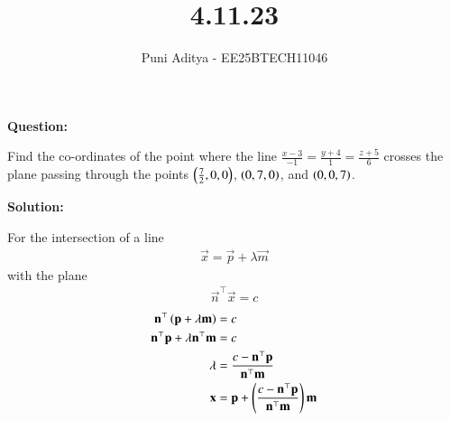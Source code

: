 \documentclass[journal]{IEEEtran}
\begin{document}
\title{4.11.23}
\author{Puni Aditya - EE25BTECH11046}
\maketitle

\textbf{Question:}

Find the co-ordinates of the point where the line $\frac{x-3}{-1} = \frac{y+4}{1} = \frac{z+5}{6}$ crosses the plane passing through the points $\left(\frac{7}{2}, 0, 0\right)$, $\left(0, 7, 0\right)$, and $\left(0, 0, 7\right)$.

\textbf{Solution:}

For the intersection of a line
\begin{align*}
    \vec{x} = \vec{p} + \lambda\vec{m}
\end{align*}    
with the plane
\begin{align*}
    \vec{n}^\top\vec{x} = c
\end{align*}
\begin{align}
    \mathbf{n}^\top\left(\mathbf{p}+\lambda\mathbf{m}\right) &= c \\
    \mathbf{n}^\top\mathbf{p} + \lambda\mathbf{n}^\top\mathbf{m} &= c \\
    \lambda &= \frac{c - \mathbf{n}^\top\mathbf{p}}{\mathbf{n}^\top\mathbf{m}} \label{eq:27} \\
    \mathbf{x} &= \mathbf{p} + \left(\frac{c - \mathbf{n}^\top\mathbf{p}}{\mathbf{n}^\top\mathbf{m}}\right)\mathbf{m} \label{eq:28}
\end{align}
\end{document}
